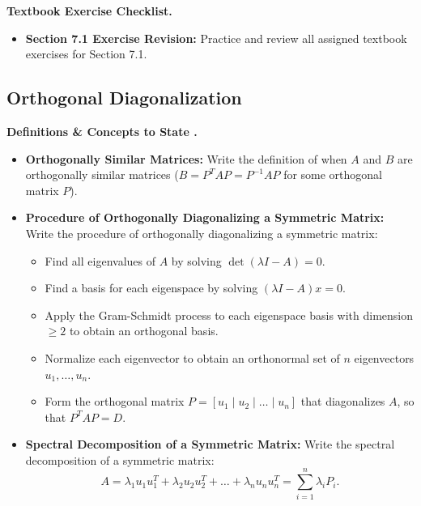\documentclass{../../../templates/natsirt}
\newcounter{topic}[section]
\newenvironment{recallbox}[1][]{%
    \begin{bluebox}[#1]\refstepcounter{topic}\textbf{Definitions \& Concepts to State \thesection.\thetopic}%
}{\end{bluebox}}
\newenvironment{reviewbox}[1][]{\begin{whitebox}[#1]\textbf{Textbook Exercise Checklist. }}{\end{whitebox}}
\newcommand{\citem}{\item[$\square$]}
\begin{document}
\begin{reviewbox}
    \begin{itemize}
        \citem \textbf{Section 7.1 Exercise Revision:} Practice and review all assigned textbook exercises for Section 7.1.
    \end{itemize}
\end{reviewbox}

\subsection{Orthogonal Diagonalization}

\begin{recallbox}
    \begin{itemize}
        \citem \textbf{Orthogonally Similar Matrices:} Write the definition of when $A$ and $B$ are orthogonally similar matrices ($B = P^T A P = P^{-1} A P$ for some orthogonal matrix $P$).
        \citem \textbf{Procedure of Orthogonally Diagonalizing a Symmetric Matrix:} Write the procedure of orthogonally diagonalizing a symmetric matrix:
        \begin{itemize}
            \citem Find all eigenvalues of $A$ by solving $\det(\lambda I - A) = 0$.
            \citem Find a basis for each eigenspace by solving $(\lambda I - A)x = 0$.
            \citem Apply the Gram-Schmidt process to each eigenspace basis with dimension $\ge 2$ to obtain an orthogonal basis.
            \citem Normalize each eigenvector to obtain an orthonormal set of $n$ eigenvectors $u_1, \dots, u_n$.
            \citem Form the orthogonal matrix $P = [u_1 \mid u_2 \mid \dots \mid u_n]$ that diagonalizes $A$, so that $P^T A P = D$.
        \end{itemize}
        \citem \textbf{Spectral Decomposition of a Symmetric Matrix:} Write the spectral decomposition of a symmetric matrix:
        \[ A = \lambda_1 u_1 u_1^T + \lambda_2 u_2 u_2^T + \dots + \lambda_n u_n u_n^T = \sum_{i=1}^n \lambda_i P_i. \]
    \end{itemize}
\end{recallbox}
\end{document}
